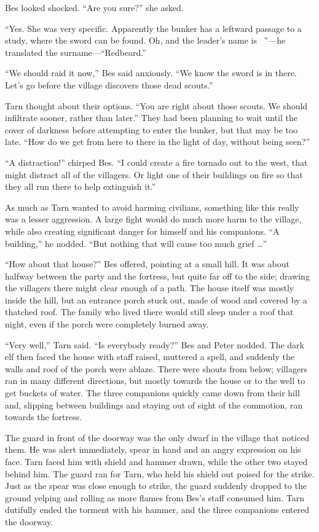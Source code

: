 Bes looked shocked.  ``Are you sure?'' she asked.

``Yes.  She was very specific.  Apparently the bunker has a leftward passage to a study, where the sword can be found.  Oh, and the leader's name is \mothzam\ \driktur''---he translated the surname---``Redbeard.''

``We should raid it now,'' Bes said anxiously.  ``We know the sword is in there.  Let's go before the village discovers those dead scouts.''

Tarn thought about their options.  ``You are right about those scouts.  We should infiltrate sooner, rather than later.''  They had been planning to wait until the cover of darkness before attempting to enter the bunker, but that may be too late.  ``How do we get from here to there in the light of day, without being seen?''

``A distraction!'' chirped Bes.  ``I could create a fire tornado out to the west, that might distract all of the villagers.  Or light one of their buildings on fire so that they all run there to help extinguish it.''

As much as Tarn wanted to avoid harming civilians, something like this really was a lesser aggression.  A large fight would do much more harm to the village, while also creating significant danger for himself and his companions.  ``A building,'' he nodded.  ``But nothing that will cause too much grief \ldots''

``How about that house?'' Bes offered, pointing at a small hill.  It was about halfway between the party and the fortress, but quite far off to the side; drawing the villagers there might clear enough of a path.  The house itself was mostly inside the hill, but an entrance porch stuck out, made of wood and covered by a thatched roof.  The family who lived there would still sleep under a roof that night, even if the porch were completely burned away.

``Very well,'' Tarn said. ``Is everybody ready?''  Bes and Peter nodded.  The dark elf then faced the house with staff raised, muttered a spell, and suddenly the walls and roof of the porch were ablaze.  There were shouts from below; villagers ran in many different directions, but mostly towards the house or to the well to get buckets of water.  The three companions quickly came down from their hill and, slipping between buildings and staying out of sight of the commotion, ran towards the fortress.

The guard in front of the doorway was the only dwarf in the village that noticed them.  He was alert immediately, spear in hand and an angry expression on his face.  Tarn faced him with shield and hammer drawn, while the other two stayed behind him.  The guard ran for Tarn, who held his shield out poised for the strike.  Just as the spear was close enough to strike, the guard suddenly dropped to the ground yelping and rolling as more flames from Bes's staff consumed him.  Tarn dutifully ended the torment with his hammer, and the three companions entered the doorway.